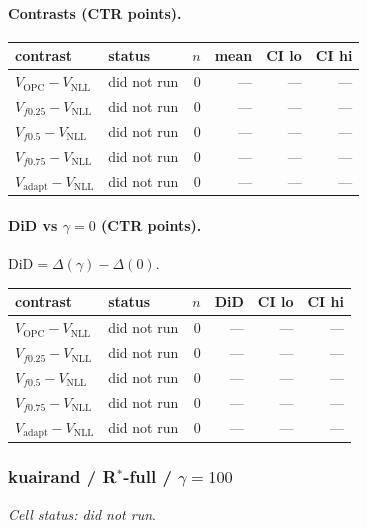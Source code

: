 \documentclass[10pt,a4paper]{article}
\begin{document}
\paragraph{Contrasts (CTR points).}
{\centering\small\begin{tabular}{llrrrr}
\toprule contrast & status & $n$ & mean & CI lo & CI hi \\
\midrule
$V_{\mathrm{OPC}}-V_{\mathrm{NLL}}$ & did not run & 0 & --- & --- & --- \\
$V_{f0.25}-V_{\mathrm{NLL}}$ & did not run & 0 & --- & --- & --- \\
$V_{f0.5}-V_{\mathrm{NLL}}$ & did not run & 0 & --- & --- & --- \\
$V_{f0.75}-V_{\mathrm{NLL}}$ & did not run & 0 & --- & --- & --- \\
$V_{\mathrm{adapt}}-V_{\mathrm{NLL}}$ & did not run & 0 & --- & --- & --- \\
\bottomrule\end{tabular}\par}
\paragraph{DiD vs $\gamma=0$ (CTR points).} $\mathrm{DiD}=\Delta(\gamma)-\Delta(0)$.
{\centering\small\begin{tabular}{llrrrr}
\toprule contrast & status & $n$ & DiD & CI lo & CI hi \\
\midrule
$V_{\mathrm{OPC}}-V_{\mathrm{NLL}}$ & did not run & 0 & --- & --- & --- \\
$V_{f0.25}-V_{\mathrm{NLL}}$ & did not run & 0 & --- & --- & --- \\
$V_{f0.5}-V_{\mathrm{NLL}}$ & did not run & 0 & --- & --- & --- \\
$V_{f0.75}-V_{\mathrm{NLL}}$ & did not run & 0 & --- & --- & --- \\
$V_{\mathrm{adapt}}-V_{\mathrm{NLL}}$ & did not run & 0 & --- & --- & --- \\
\bottomrule\end{tabular}\par}
\bigskip
\subsubsection{kuairand / R$^*$-full / $\gamma=100$}
\emph{Cell status: did not run}.
\end{document}
